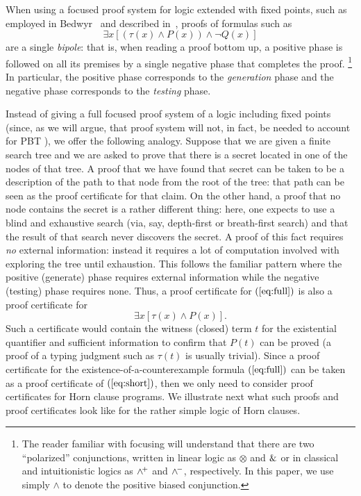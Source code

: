 \documentclass[a4paper,USenglish,cleveref, autoref, thm-restate]{lipics-v2019}
\begin{document}
When using a focused proof system for logic extended with fixed
points, such as  employed in Bedwyr~\cite{baelde07cade} and described
in~\cite{baelde12tocl,heath17linearity}, proofs of formulas such as
\[
  \exists x [(\tau(x)\wedge P(x)) \wedge \neg Q(x)]
  \tag{*}\label{eq:full}
\]
are a single \emph{bipole}: that is, when reading a proof bottom up, a
positive phase is followed on all its premises by a single negative
phase that completes the proof.%
\footnote{The reader familiar with focusing will understand that there
are two ``polarized'' conjunctions, written in linear logic as
$\otimes$ and $\&$ or in classical and intuitionistic logics as
$\wedge^{\!+}$ and $\wedge^{\!-}$, respectively.  In this paper, we use simply
$\wedge$ to denote the positive biased conjunction.}
%
In particular, the positive phase corresponds to the \emph{generation} phase
and the negative phase corresponds to the \emph{testing} phase.
%

Instead of giving a full focused proof system of a logic including
fixed points (since, as we will argue, that proof system will not, in
fact, be needed to account for PBT ), we offer the following analogy.
%
Suppose that we are given a finite search tree and we are asked to
prove that there is a secret located in one of the nodes of that
tree.
%
A proof that we have found that secret can be taken to be a
description of the path to that node from the root of the tree: that
path can be seen as the proof certificate for that claim.
%
On the other hand, a proof that no node contains the secret is a
rather different thing: here, one expects to use a blind and
exhaustive search (via, say, depth-first or breath-first search) and
that the result of that search never discovers the secret.
%
A proof of this fact requires \emph{no} external information: instead it
requires a lot of computation involved with exploring the tree until
exhaustion.
%
This follows the familiar pattern where the positive (generate) phase
requires external information while the negative (testing) phase
requires none.
%
Thus, a proof certificate for $(\ref{eq:full})$ is also a proof
certificate for 
\[
  \exists x [\tau(x)\wedge P(x)].
  \tag{**}\label{eq:short}
\]
Such a certificate would contain the witness (closed) term $t$ for the
existential quantifier and sufficient information to confirm that
$P(t)$ can be proved (a proof of a typing judgment such as $\tau(t)$
is usually trivial).
%
Since a proof certificate for the existence-of-a-counterexample formula
$(\ref{eq:full})$ can be taken as a proof certificate of
$(\ref{eq:short})$, then we only need to consider proof certificates
for Horn clause programs.
%
We illustrate next what such proofs and proof certificates look like
for the rather simple logic of Horn clauses.
\end{document}
